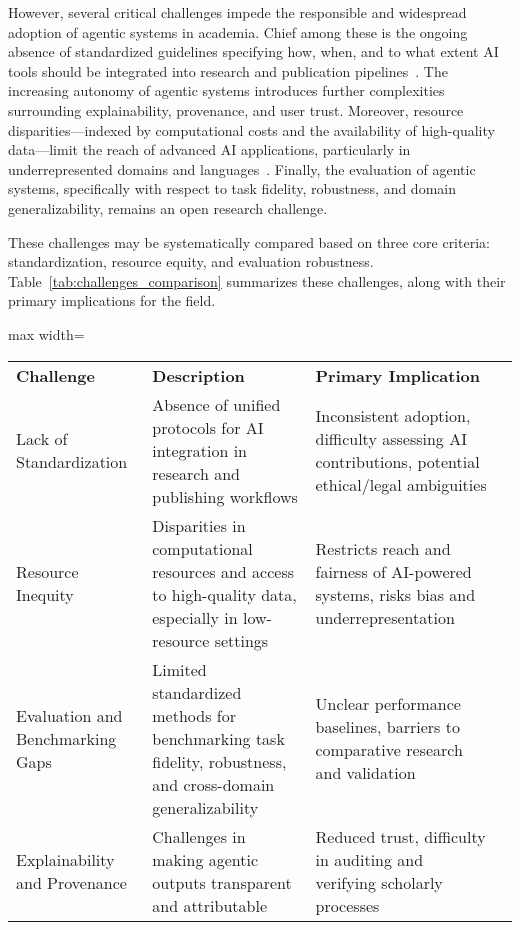 \documentclass[sigconf]{acmart}
\begin{document}
However, several critical challenges impede the responsible and widespread adoption of agentic systems in academia. Chief among these is the ongoing absence of standardized guidelines specifying how, when, and to what extent AI tools should be integrated into research and publication pipelines~\cite{ref101,ref106}. The increasing autonomy of agentic systems introduces further complexities surrounding explainability, provenance, and user trust. Moreover, resource disparities—indexed by computational costs and the availability of high-quality data—limit the reach of advanced AI applications, particularly in underrepresented domains and languages~\cite{ref103,ref104,ref106}. Finally, the evaluation of agentic systems, specifically with respect to task fidelity, robustness, and domain generalizability, remains an open research challenge.

These challenges may be systematically compared based on three core criteria: standardization, resource equity, and evaluation robustness. Table~\ref{tab:challenges_comparison} summarizes these challenges, along with their primary implications for the field.

\begin{table*}[htbp]
\centering
\caption{Principal challenges in integrating agentic systems into academic workflows, mapped to their primary implications.}
\label{tab:challenges_comparison}
\begin{adjustbox}{max width=\textwidth}
\begin{tabular}{@{}llll@{}}
\toprule
\textbf{Challenge} & \textbf{Description} & \textbf{Primary Implication} &  \\
Lack of Standardization & Absence of unified protocols for AI integration in research and publishing workflows & Inconsistent adoption, difficulty assessing AI contributions, potential ethical/legal ambiguities &  \\
Resource Inequity & Disparities in computational resources and access to high-quality data, especially in low-resource settings & Restricts reach and fairness of AI-powered systems, risks bias and underrepresentation &  \\
Evaluation and Benchmarking Gaps & Limited standardized methods for benchmarking task fidelity, robustness, and cross-domain generalizability & Unclear performance baselines, barriers to comparative research and validation  &  \\
Explainability and Provenance & Challenges in making agentic outputs transparent and attributable & Reduced trust, difficulty in auditing and verifying scholarly processes &  \\
\bottomrule
\end{tabular}
\end{adjustbox}
\end{table*}
\end{document}
